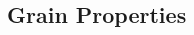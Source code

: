 \begin{frame}[fragile]
\begin{columns}
\begin{column}{3.5cm}
    \end{column}
  \end{columns}

\end{frame}


%

\subsection*{Grain Properties}



